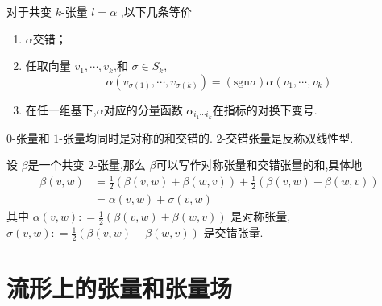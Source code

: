 \documentclass[../../几何与拓扑.tex]{subfiles}
\begin{document}
\begin{remark}
    对于共变 $ k $-张量 $ l=\alpha $  ,以下几条等价
\begin{enumerate}
    \item $ \alpha $交错；
    \item 任取向量 $ v_1,\cdots ,v_{k} $,和 $ \sigma\in S_{k} $, $$
    \alpha\left( v_{\sigma\left( 1 \right) },\cdots ,v_{\sigma\left( k \right) } \right) = \left( \mathrm{sgn} \sigma \right) \alpha\left( v_1,\cdots ,v_{k} \right)   
    $$    
    \item 在任一组基下,$ \alpha $对应的分量函数 $ \alpha_{i_1\cdots i_{k}} $在指标的对换下变号.  
\end{enumerate}
\end{remark}
\begin{remark}
    $ 0 $-张量和 $ 1 $-张量均同时是对称的和交错的. $ 2 $-交错张量是反称双线性型.   
\end{remark}

\begin{proposition}
    设 $ \beta $是一个共变 $ 2 $-张量,那么 $ \beta $可以写作对称张量和交错张量的和,具体地 $$
    \begin{aligned}
        \beta\left( v,w \right)&= \frac{1}{2}\left( \beta\left( v,w \right)+ \beta\left( w,v \right)   \right)+  \frac{1}{2} \left(\beta\left( v,w \right)-\beta\left( w,v \right)   \right)   \\ 
          & = \alpha\left( v,w \right)+ \sigma\left( v,w \right)  
    \end{aligned}
    $$其中 $ \alpha\left( v,w \right): = \frac{1}{2}\left( \beta\left( v,w \right)+ \beta\left( w,v \right)   \right)   $ 是对称张量, $ \sigma\left( v,w \right): = \frac{1}{2}\left( \beta\left( v,w \right)-\beta\left( w,v \right)   \right)   $ 是交错张量.
\end{proposition}

\section{流形上的张量和张量场}
\end{document}
